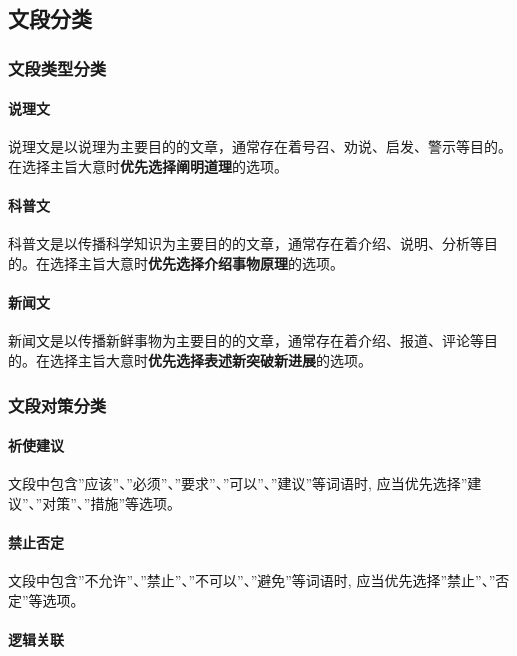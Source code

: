 \subsection{文段分类}

\subsubsection{文段类型分类}

\paragraph{说理文}

说理文是以说理为主要目的的文章，通常存在着号召、劝说、启发、警示等目的。在选择主旨大意时\textbf{优先选择阐明道理}的选项。

\paragraph{科普文}

科普文是以传播科学知识为主要目的的文章，通常存在着介绍、说明、分析等目的。在选择主旨大意时\textbf{优先选择介绍事物原理}的选项。

\paragraph{新闻文}

新闻文是以传播新鲜事物为主要目的的文章，通常存在着介绍、报道、评论等目的。在选择主旨大意时\textbf{优先选择表述新突破新进展}的选项。

\subsubsection{文段对策分类}

\paragraph{祈使建议}

文段中包含''应该''、''必须''、''要求''、''可以''、''建议''等词语时, 应当优先选择''建议''、''对策''、''措施''等选项。

\paragraph{禁止否定}

文段中包含''不允许''、''禁止''、''不可以''、''避免''等词语时, 应当优先选择''禁止''、''否定''等选项。

\paragraph{逻辑关联}

